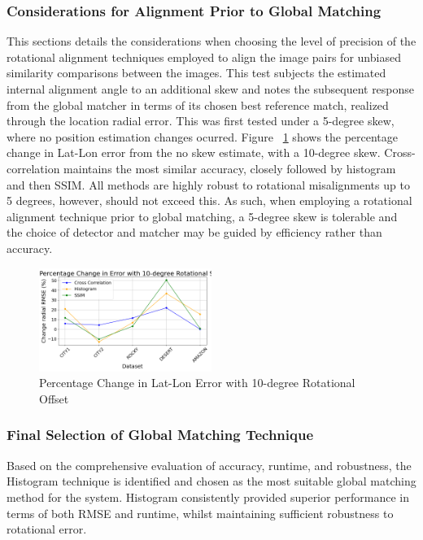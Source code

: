 \subsubsection*{Considerations for Alignment Prior to Global Matching}

This sections details the considerations when choosing the level of precision of the rotational alignment techniques employed to align the image pairs for unbiased similarity comparisons between the images. This test subjects the estimated internal alignment angle to an additional skew and notes the subsequent response from the global matcher in terms of its chosen best reference match, realized through the location radial error. This was first tested under a 5-degree skew, where no position estimation changes ocurred. Figure ~\ref{fig:percentage_change_comparison_methods} shows the percentage change in Lat-Lon error from the no skew estimate, with a 10-degree skew. Cross-correlation maintains the most similar accuracy, closely followed by histogram and then SSIM. All methods are highly robust to rotational misalignments up to 5 degrees, however, should not exceed this. As such, when employing a rotational alignment technique prior to global matching, a 5-degree skew is tolerable and the choice of detector and matcher may be guided by efficiency rather than accuracy.


\begin{figure}[H]
    \centering
    \includegraphics[width=0.5\textwidth]{./Chapter 4/testresults/percentage_change_comparison_methods.png}
    \caption{Percentage Change in Lat-Lon Error with 10-degree Rotational Offset}
    \label{fig:percentage_change_comparison_methods}
\end{figure}





\subsubsection*{Final Selection of Global Matching Technique}

Based on the comprehensive evaluation of accuracy, runtime, and robustness, the Histogram technique is identified and chosen as the most suitable global matching method for the system. Histogram consistently provided superior performance in terms of both RMSE and runtime, whilst maintaining sufficient robustness to rotational error. 



